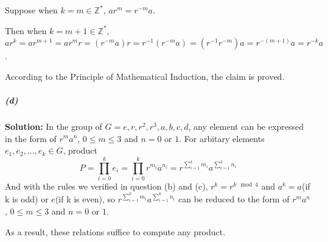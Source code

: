 \documentclass[11pt]{report}
\begin{document}
    Suppose when $ k = m \in \mathbb{Z}^*$, $ar^m = r^{-m}a$.
    
    Then when $k = m + 1 \in \mathbb{Z}^*$, $ar^k = ar^{m+1} = ar^mr = (r^{-m}a)r = r^{-1}(r^{-m}a) = (r^{-1}r^{-m})a = r^{-(m+1)}a = r^{-k}a$.
    
    According to the Principle of Mathematical Induction, the claim is proved.
    
    \subparagraph{(d)} \textbf{Solution:} In the group of $G = {e, r, r^2, r^3, a, b, c, d}$, any element can be expressed in the form of $r^ma^n$, $0 \leq m \leq 3$ and $n = 0$ or $1$. For arbitary elements $e_1, e_2, ..., e_k \in G$, product \[P = \prod_{i = 0}^k e_i = \prod_{i = 0}^k r^{m_i}a^{n_i}=r^{\sum_{i=1}^k m_i}a^{\sum_{i=1}^k n_i}\]
    And with the rules we verified in question (b) and (c), $r^k = r^{k\mod 4}$ and $a^k = a$(if k is odd) or $e$(if k is even), so $r^{\sum_{i=1}^k m_i}a^{\sum_{i=1}^k n_i}$ can be reduced to the form of $r^ma^n$, $0 \leq m \leq 3$ and $n = 0$ or $1$.
    
    As a result, these relations suffice to compute any product.
\end{document}
